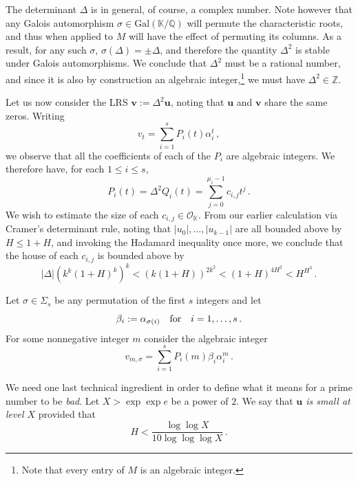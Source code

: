 \documentclass[preprint,12pt]{elsarticle}
\begin{document}
The determinant $\Delta$ is in general, of course, a complex number. Note however that
any Galois automorphism $\sigma \in
\mathrm{Gal}(\mathbb{K}/\mathbb{Q})$ will permute the characteristic
roots, and thus when applied to $M$ will have the effect of
permuting its columns. As a result, for any such $\sigma$,
$\sigma(\Delta) = \pm \Delta$, and therefore the quantity $\Delta^2$
is stable under Galois automorphisms. We conclude that $\Delta^2$
must be a rational number, and since it is also by construction an
algebraic integer,\footnote{Note that every entry of $M$ is an
  algebraic integer.} we must have $\Delta^2 \in \mathbb{Z}$.

Let us now consider the LRS 
$\mathbf{v} := \Delta^2\mathbf{u}$, noting that $\mathbf{u}$ and
$\mathbf{v}$ share the same zeros. Writing
\[
v_t=\sum_{i=1}^s P_i(t) \alpha_i^t \, ,
\]
we observe that all the coefficients of each of the $P_i$ are
algebraic integers. We therefore have, for each $1 \leq i \leq s$,
\[
P_i(t) = \Delta^2 Q_i(t)=\sum_{j=0}^{\mu_i-1} c_{i,j} t^j \, .
\]
We wish to estimate the size of each $c_{i,j}\in
{\mathcal O}_{\mathbb K}$. From our earlier calculation via Cramer's
determinant rule, noting that $|u_0|,\ldots,|u_{k-1}|$ are all bounded
above by $H \leq 1+H$, and invoking the Hadamard inequality once more,
we conclude that the house of each $c_{i,j}$ is bounded above by
\begin{equation}
\label{eq:house}
  |\Delta| (k^k(1+H)^k)^k < (k(1+H))^{2k^2} < (1+H)^{4H^2}< H^{H^3}
  \, .
\end{equation}  

Let $\sigma\in \Sigma_s$ be any permutation of the first $s$ integers and let 
\[
\beta_i:=\alpha_{\sigma(i)}\quad {\text{\rm for}}\quad i=1,\ldots,s
\, .
\]
For some nonnegative integer $m$ consider the algebraic integer
\begin{equation}
\label{eq:21}
v_{m,\sigma}=\sum_{i=1}^s P_i(m)\beta_i \alpha_i^{m} \, .
\end{equation}

We need one last technical ingredient in order to define what it means for a prime number to be
\emph{bad}. Let $X > \exp \exp e$ be a power of $2$. We say that \emph{$\mathbf{u}$ is
small at level $X$} provided that
  \[H < \frac{\log \log X}{10\log \log \log X} \, .\]
\end{document}
